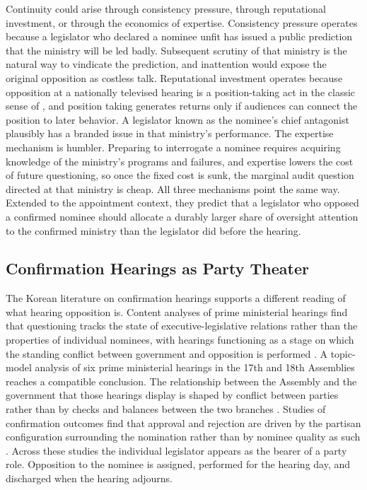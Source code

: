 \documentclass[11pt]{article}
\begin{document}
Continuity could arise through consistency pressure, through reputational investment, or through the economics of expertise. Consistency pressure operates because a legislator who declared a nominee unfit has issued a public prediction that the ministry will be led badly. Subsequent scrutiny of that ministry is the natural way to vindicate the prediction, and inattention would expose the original opposition as costless talk. Reputational investment operates because opposition at a nationally televised hearing is a position-taking act in the classic sense of \citet{mayhew1974}, and position taking generates returns only if audiences can connect the position to later behavior. A legislator known as the nominee's chief antagonist plausibly has a branded issue in that ministry's performance. The expertise mechanism is humbler. Preparing to interrogate a nominee requires acquiring knowledge of the ministry's programs and failures, and expertise lowers the cost of future questioning, so once the fixed cost is sunk, the marginal audit question directed at that ministry is cheap. All three mechanisms point the same way. Extended to the appointment context, they predict that a legislator who opposed a confirmed nominee should allocate a durably larger share of oversight attention to the confirmed ministry than the legislator did before the hearing.

\subsection{Confirmation Hearings as Party Theater}

The Korean literature on confirmation hearings supports a different reading of what hearing opposition is. Content analyses of prime ministerial hearings find that questioning tracks the state of executive-legislative relations rather than the properties of individual nominees, with hearings functioning as a stage on which the standing conflict between government and opposition is performed \citep{choi2008}. A topic-model analysis of six prime ministerial hearings in the 17th and 18th Assemblies reaches a compatible conclusion. The relationship between the Assembly and the government that those hearings display is shaped by conflict between parties rather than by checks and balances between the two branches \citep{ko2018}. Studies of confirmation outcomes find that approval and rejection are driven by the partisan configuration surrounding the nomination rather than by nominee quality as such \citep{yoon2020}. Across these studies the individual legislator appears as the bearer of a party role. Opposition to the nominee is assigned, performed for the hearing day, and discharged when the hearing adjourns.
\end{document}
